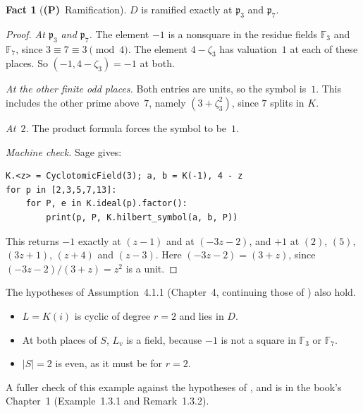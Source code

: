 \documentclass[11pt]{article}
\newcommand{\F}{\mathbb F}
\newcommand{\p}{\mathfrak p}
\newcommand{\Ptag}{\textbf{(P)}}
\theoremstyle{definition}
\newtheorem{fact}{Fact}
\begin{document}
\begin{fact}[\Ptag\ Ramification]
$D$ is ramified exactly at $\p_3$ and $\p_7$.
\end{fact}
\begin{proof}
\emph{At $\p_3$ and $\p_7$.} The element $-1$ is a nonsquare in the
residue fields $\F_3$ and $\F_7$, since $3\equiv7\equiv3\pmod4$. The
element $4-\zeta_3$ has valuation~$1$ at each of these places. So
$(-1,4-\zeta_3)=-1$ at both.

\emph{At the other finite odd places.} Both entries are units, so the
symbol is~$1$. This includes the other prime above~$7$, namely
$(3+\zeta_3^2)$, since $7$ splits in $K$.

\emph{At~$2$.} The product formula forces the symbol to be~$1$.

\emph{Machine check.} Sage gives:
\begin{lstlisting}
K.<z> = CyclotomicField(3); a, b = K(-1), 4 - z
for p in [2,3,5,7,13]:
    for P, e in K.ideal(p).factor():
        print(p, P, K.hilbert_symbol(a, b, P))
\end{lstlisting}
This returns $-1$ exactly at $(z-1)$ and at $(-3z-2)$, and $+1$ at
$(2)$, $(5)$, $(3z+1)$, $(z+4)$ and $(z-3)$. Here $(-3z-2)=(3+z)$,
since $(-3z-2)/(3+z)=z^2$ is a unit.
\end{proof}

The hypotheses of Assumption~4.1.1 (Chapter~4, continuing those of
\cite[\S1]{JC26}) also hold.
\begin{itemize}
\item $L=K(i)$ is cyclic of degree $r=2$ and lies in $D$.
\item At both places of $S$, $L_v$ is a field, because $-1$ is not a
square in $\F_3$ or $\F_7$.
\item $|S|=2$ is even, as it must be for $r=2$.
\end{itemize}
A fuller check of this example against the hypotheses of \cite{JC26},
\cite{FK86} and \cite{FK88} is in the book's Chapter~1
(Example~1.3.1 and Remark~1.3.2).
\end{document}
